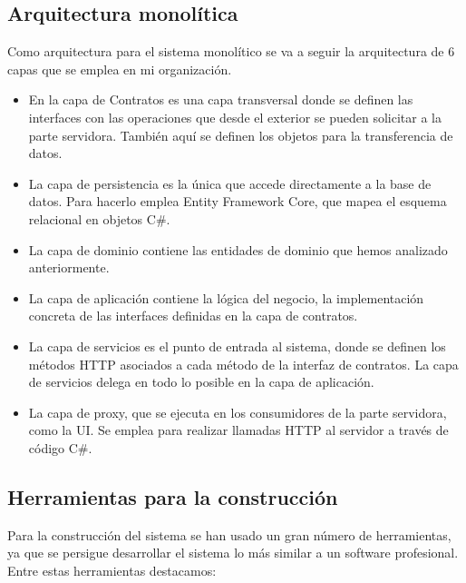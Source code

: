 \documentclass[11pt,a4paper]{article}
\begin{document}
\subsection{Arquitectura monolítica}

Como arquitectura para el sistema monolítico se va a seguir la arquitectura de 6 capas que se emplea en mi organización.

\begin{itemize}

\item En la capa de Contratos es una capa transversal donde se definen las interfaces con las operaciones que desde el exterior se pueden solicitar a la parte servidora. También aquí se definen los objetos para la transferencia de datos.

\item La capa de persistencia es la única que accede directamente a la base de datos. Para hacerlo emplea Entity Framework Core, que mapea el esquema relacional en objetos C\#.

\item La capa de dominio contiene las entidades de dominio que hemos analizado anteriormente.

\item La capa de aplicación contiene la lógica del negocio, la implementación concreta de las interfaces definidas en la capa de contratos.

\item La capa de servicios es el punto de entrada al sistema, donde se definen los métodos HTTP asociados a cada método de la interfaz de contratos. La capa de servicios delega en todo lo posible en la capa de aplicación.

\item La capa de proxy, que se ejecuta en los consumidores de la parte servidora, como la UI. Se emplea para realizar llamadas HTTP al servidor a través de código C\#.

\end{itemize}

\subsection{Herramientas para la construcción}

Para la construcción del sistema se han usado un gran número de herramientas, ya que se persigue desarrollar el sistema lo más similar a un software profesional. Entre estas herramientas destacamos:
\end{document}
